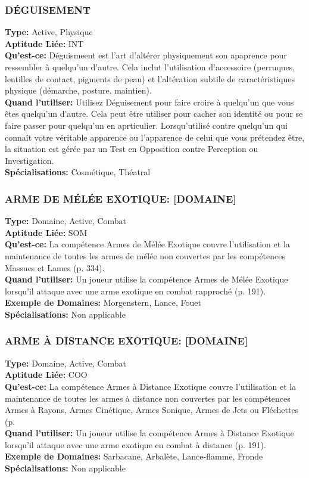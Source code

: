 \subsubsection{DÉGUISEMENT} \textbf{Type:} Active, Physique \\ \textbf{Aptitude Liée:} INT \\ \textbf{Qu'est-ce:} Déguismeent est l'art d'altérer physiquement son apaprence pour ressembler à quelqu'un d'autre. Cela inclut l'utilisation d'accessoire (perruques, lentilles de contact, pigments de peau) et l'altération subtile de caractéristiques physique (démarche, posture, maintien). \\ \textbf{Quand l'utiliser:} Utilisez Déguisement pour faire croire à quelqu'un que vous êtes quelqu'un d'autre. Cela peut être utiliser pour cacher son identité ou pour se faire passer pour quelqu'un en aprticulier. Lorsqu'utilisé contre quelqu'un qui connaît votre véritable apparence ou l'apparence de celui que vous prétendez être, la situation est gérée par un Test en Opposition contre Perception ou Investigation. \\ \textbf{Spécialisations:} Cosmétique, Théatral 

\subsubsection{ARME DE MÉLÉE EXOTIQUE: [DOMAINE]} \textbf{Type:} Domaine, Active, Combat \\ \textbf{Aptitude Liée:} SOM \\ \textbf{Qu'est-ce:} La compétence Armes de Mélée Exotique couvre l'utilisation et la maintenance de toutes les armes de mélée non couvertes par les compétences Massues et Lames (p. 334). \\ \textbf{Quand l'utiliser:} Un joueur utilise la compétence Armes de Mélée Exotique lorsqu'il attaque avec une arme exotique en combat rapproché (p. 191). \\ \textbf{Exemple de Domaines:} Morgenstern, Lance, Fouet \\ \textbf{Spécialisations:} Non applicable 

\subsubsection{ARME À DISTANCE EXOTIQUE: [DOMAINE]} \textbf{Type:} Domaine, Active, Combat \\ \textbf{Aptitude Liée:} COO \\ \textbf{Qu'est-ce:} La compétence Armes à Distance Exotique couvre l'utilisation et la maintenance de toutes les armes à distance non couvertes par les compétences Armes à Rayons, Armes Cinétique, Armes Sonique, Armes de Jets ou Fléchettes (p. \\ \textbf{Quand l'utiliser:} Un joueur utilise la compétence Armes à Distance Exotique lorsqu'il attaque avec une arme exotique en combat à distance (p. 191). \\ \textbf{Exemple de Domaines:} Sarbacane, Arbalète, Lance-flamme, Fronde \\ \textbf{Spécialisations:} Non applicable 

